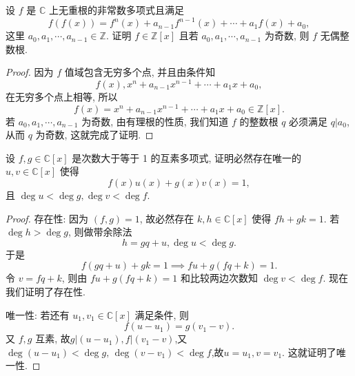 \documentclass[../../main.tex]{subfiles}
\begin{document}
\begin{example}
设 \( f \) 是 \( \mathbb{C} \) 上无重根的非常数多项式且满足
\[
f(f(x)) = f^n(x) + a_{n-1}f^{n-1}(x) + \cdots + a_1f(x) + a_0,
\]
这里 \( a_0, a_1, \cdots, a_{n-1} \in \mathbb{Z} \). 证明 \( f \in \mathbb{Z}[x] \) 且若 \( a_0, a_1, \cdots, a_{n-1} \) 为奇数, 则 \( f \) 无偶整数根.
\end{example}
\begin{proof}
因为 \( f \) 值域包含无穷多个点, 并且由条件知
\[
f(x), x^n + a_{n-1}x^{n-1} + \cdots + a_1x + a_0,
\]
在无穷多个点上相等, 所以
\[
f(x) = x^n + a_{n-1}x^{n-1} + \cdots + a_1x + a_0 \in \mathbb{Z}[x].
\]
若 \( a_0, a_1, \cdots, a_{n-1} \) 为奇数, 由有理根的性质, 我们知道 \( f \) 的整数根 \( q \) 必须满足 \( q|a_0 \), 从而 \( q \) 为奇数, 这就完成了证明.
\end{proof}

\begin{proposition}
设 \( f,g \in \mathbb{C}[x] \) 是次数大于等于 1 的互素多项式, 证明必然存在唯一的 \( u,v \in \mathbb{C}[x] \) 使得
\[
f(x)u(x) + g(x)v(x) = 1,
\]
且 \( \deg u < \deg g, \deg v < \deg f \).
\end{proposition}
\begin{proof}
存在性:
因为 \( (f,g) = 1 \), 故必然存在 \( k,h \in \mathbb{C}[x] \) 使得 \( fh + gk = 1 \). 若 \( \deg h > \deg g \), 则做带余除法
\[
h = gq + u, \deg u < \deg g.
\]
于是
\[
f(gq + u) + gk = 1 \implies fu + g(fq + k) = 1.
\]
令 \( v = fq + k \), 则由 \( fu + g(fq + k) = 1 \) 和比较两边次数知 \( \deg v < \deg f \). 现在我们证明了存在性.

唯一性:
若还有 \( u_1, v_1 \in \mathbb{C}[x] \) 满足条件, 则
\[
f(u - u_1) = g(v_1 - v).
\]
又 \( f,g \) 互素, 故$
g|(u - u_1), f|(v_1 - v)$,又$\deg (u-u_1)<\deg g,\,\deg(v-v_1)<\deg f$,故$u = u_1, v = v_1$.
这就证明了唯一性.
\end{proof}
\end{document}
